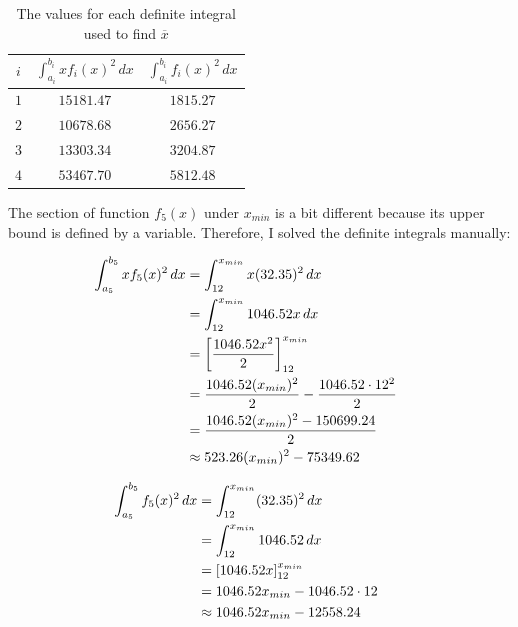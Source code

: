 \documentclass[11pt]{article}
\begin{document}
    \begin{table}[H]
        \scriptsize
        \renewcommand{\arraystretch}{0.9}
        \centering
        \caption{The values for each definite integral used to find $\overline{x}$}
        \vspace{-8pt}
        \begin{tabular}{|c|c|c|}
            \hline
             $i$ & $\int_{a_i}^{b_i} x f_i(x)^2 \, dx$ & $\int_{a_i}^{b_i} f_i(x)^2 \, dx$ \\
             \hline \hline
             $1$ & $15181.47$ & $1815.27$ \\
             \hline
             $2$ & $10678.68$ & $2656.27$ \\
             \hline
             $3$ & $13303.34$ & $3204.87$ \\
             \hline
             $4$ & $53467.70$ & $5812.48$ \\
             \hline
        \end{tabular}
        \label{tab:water-x-bottom-integrals}
    \end{table}
    \vspace{-10pt}

    The section of function $f_5(x)$ under $x_{min}$ is a bit different because its upper bound is defined by a variable. Therefore, I solved the definite integrals manually:

    \begin{minipage}{.5\linewidth}
        {\footnotesize\begin{align*}
            \hspace*{-20pt}
            \int_{a_5}^{b_5} x f_5(x)^2 \, dx &= \int_{12}^{x_{min}} x (32.35)^2 \, dx \\
            &= \int_{12}^{x_{min}} 1046.52x \, dx \\
            &= \left[ \frac{1046.52x^2}{2} \right]_{12}^{x_{min}} \\
            &= \frac{1046.52 (x_{min})^2}{2} - \frac{1046.52 \cdot 12^2}{2} \\
            &= \frac{1046.52 (x_{min})^2 - 150699.24}{2} \\
            &\approx 523.26 (x_{min})^2 - 75349.62
        \end{align*}}
    \end{minipage}%
    \begin{minipage}{.5\linewidth}
        {\footnotesize\begin{align*}
            \hspace*{-20pt}
            \int_{a_5}^{b_5} f_5(x)^2 \, dx &= \int_{12}^{x_{min}} (32.35)^2 \, dx \\
            &= \int_{12}^{x_{min}} 1046.52 \, dx \\
            &= \left[ 1046.52x \right]_{12}^{x_{min}} \\
            &= 1046.52x_{min} - 1046.52 \cdot 12 \\
            &\approx 1046.52x_{min} - 12558.24
        \end{align*}}
    \end{minipage}
    \vspace{2pt}
\end{document}
